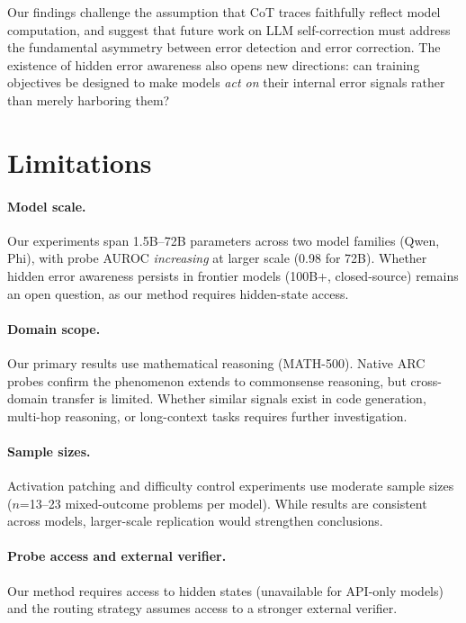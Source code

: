 \documentclass[11pt]{article}
\begin{document}
Our findings challenge the assumption that CoT traces faithfully reflect model computation, and suggest that future work on LLM self-correction must address the fundamental asymmetry between error detection and error correction.
The existence of hidden error awareness also opens new directions: can training objectives be designed to make models \textit{act on} their internal error signals rather than merely harboring them?

\section*{Limitations}

\paragraph{Model scale.} Our experiments span 1.5B--72B parameters across two model families (Qwen, Phi), with probe AUROC \textit{increasing} at larger scale (0.98 for 72B). Whether hidden error awareness persists in frontier models (100B+, closed-source) remains an open question, as our method requires hidden-state access.

\paragraph{Domain scope.} Our primary results use mathematical reasoning (MATH-500). Native ARC probes confirm the phenomenon extends to commonsense reasoning, but cross-domain transfer is limited. Whether similar signals exist in code generation, multi-hop reasoning, or long-context tasks requires further investigation.

\paragraph{Sample sizes.} Activation patching and difficulty control experiments use moderate sample sizes ($n$=13--23 mixed-outcome problems per model). While results are consistent across models, larger-scale replication would strengthen conclusions.

\paragraph{Probe access and external verifier.} Our method requires access to hidden states (unavailable for API-only models) and the routing strategy assumes access to a stronger external verifier.
\end{document}
